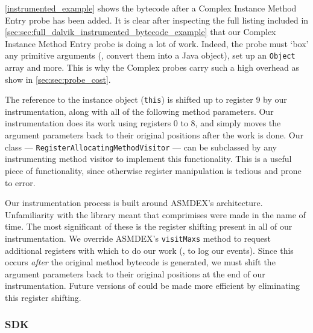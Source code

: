 \autoref{instrumented_example} shows the bytecode after a Complex Instance
Method Entry probe has been added. It is clear after inspecting the full listing
included in \autoref{sec:sec:full_dalvik_instrumented_bytecode_example} that our
Complex Instance Method Entry probe is doing a lot of work. Indeed, the probe
must {\lq}box{\rq} any primitive arguments (\ie, convert them into a Java
object), set up an {\tt Object} array and more. This is why the Complex probes
carry such a high overhead as show in \autoref{sec:sec:probe_cost}.

The reference to the instance object ({\tt this}) is shifted up to
register 9 by our instrumentation, along with all of the following method
parameters. Our instrumentation does its work using registers 0 to 8, and simply
moves the argument parameters back to their original positions after the work is
done. Our class --- {\tt RegisterAllocatingMethodVisitor} --- can be subclassed
by any instrumenting method visitor to implement this functionality. This is a
useful piece of functionality, since otherwise register manipulation is tedious
and prone to error.

Our instrumentation process is built around ASMDEX's architecture. Unfamiliarity
with the library meant that comprimises were made in the name of time. The most
significant of these is the register shifting present in all of our
instrumentation. We override ASMDEX's {\tt visitMaxs} method to request
additional registers with which to do our work (\ie, to log our events). Since
this occurs \textit{after} the original method bytecode is generated, we must
shift the argument parameters back to their original positions at the end of our
instrumentation. Future versions of \venera could be made more efficient by
eliminating this register shifting.

\subsubsection{\venera SDK}
\label{sec:sec:venera_sdk}

